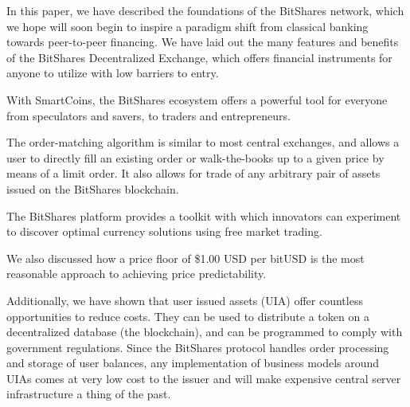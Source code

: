 In this paper, we have described the foundations of the BitShares network,
which we hope will soon begin to inspire a paradigm shift from classical
banking towards peer-to-peer financing. We have laid out the many features and
benefits of the BitShares Decentralized Exchange, which offers financial
instruments for anyone to utilize with low barriers to entry.

With SmartCoins, the BitShares ecosystem offers a powerful tool for everyone
from speculators and savers, to traders and entrepreneurs.

The order-matching algorithm is similar to most central exchanges, and allows a
user to directly fill an existing order or walk-the-books up to a given price
by means of a limit order. It also allows for trade of any arbitrary pair of
assets issued on the BitShares blockchain.

The BitShares platform provides a toolkit with which innovators can experiment
to discover optimal currency solutions using free market trading.

We also discussed how a price floor of \$1.00 USD per bitUSD is the most
reasonable approach to achieving price predictability.

Additionally, we have shown that user issued assets (UIA) offer countless
opportunities to reduce costs. They can be used to distribute a token on a
decentralized database (the blockchain), and can be programmed to comply with
government regulations. Since the BitShares protocol handles order processing
and storage of user balances, any implementation of business models around UIAs
comes at very low cost to the issuer and will make expensive central server
infrastructure a thing of the past. 
